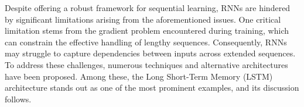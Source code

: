 Despite offering a robust framework for sequential learning, RNNs are hindered by significant limitations arising from the aforementioned issues. One critical limitation stems from the gradient problem encountered during training, which can constrain the effective handling of lengthy sequences. Consequently, RNNs may struggle to capture dependencies between inputs across extended sequences. To address these challenges, numerous techniques and alternative architectures have been proposed. Among these, the Long Short-Term Memory (LSTM) architecture stands out as one of the most prominent examples, and its discussion follows.
